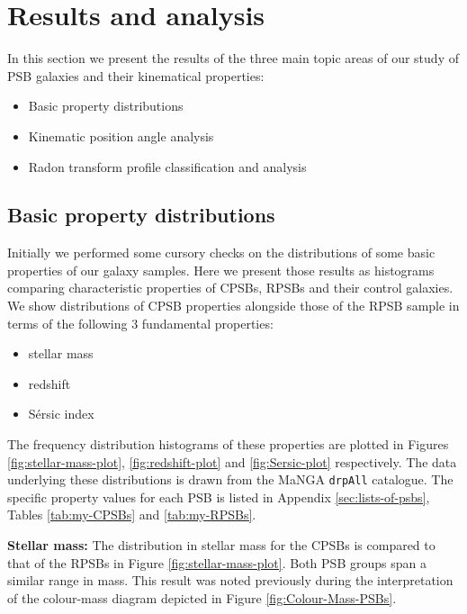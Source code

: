 \section{Results and analysis}
\label{sec:results}

In this section we present the results of the three main topic areas of our study of PSB galaxies and their kinematical properties:

\begin{itemize}
    \item Basic property distributions
    \item Kinematic position angle analysis
    \item Radon transform profile classification and analysis
\end{itemize}

\subsection{Basic property distributions}
\label{sec:property-distributions}
Initially we performed some cursory checks on the distributions of some basic properties of our galaxy samples. Here we present those results as histograms comparing characteristic properties of CPSBs, RPSBs and their control galaxies. We show distributions of CPSB properties alongside those of the RPSB sample in terms of the following 3 fundamental properties: 
\begin{itemize}
\item stellar mass
\item redshift
\item S\'ersic index
\end{itemize}
The frequency distribution histograms of these properties are plotted in Figures \ref{fig:stellar-mass-plot}, \ref{fig:redshift-plot} and \ref{fig:Sersic-plot} respectively. The data underlying these  distributions is drawn from the MaNGA \texttt{drpAll} catalogue. The specific property values for each PSB is listed in Appendix \ref{sec:lists-of-psbs}, Tables \ref{tab:my-CPSBs} and \ref{tab:my-RPSBs}.

\textbf{Stellar mass:} The distribution in stellar mass for the CPSBs is compared to that of the RPSBs in Figure \ref{fig:stellar-mass-plot}. Both PSB groups span a similar range in mass. This result was noted previously during the interpretation of the colour-mass diagram depicted in Figure \ref{fig:Colour-Mass-PSBs}.

